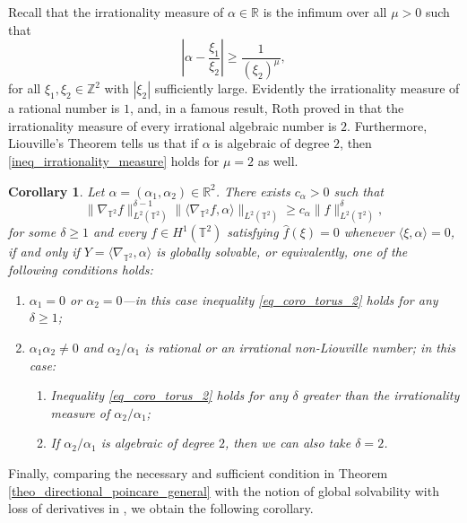 \documentclass[11pt]{amsart}
\numberwithin{theorem}{section}
\numberwithin{equation}{section}
\newtheorem{corollary}[theorem]{Corollary}
\theoremstyle{definition}
\numberwithin{example}{section}
\theoremstyle{definition}
\theoremstyle{definition}
\newcommand{\R}{\mathbb{R}}
\newcommand{\Z}{\mathbb{Z}}
\newcommand{\T}{\mathbb{T}}
\begin{document}
Recall that the irrationality measure of $\alpha\in\R$ is the infimum over all $\mu>0$ such that
\begin{equation}\label{ineq_irrationality_measure}
    \left|\alpha-\frac{\xi_1}{\xi_2}\right|\geq \frac{1}{(\xi_2)^{\mu}},
\end{equation}
for all $\xi_1,\xi_2\in\Z^2$ with $|\xi_2|$ sufficiently large. Evidently the irrationality measure of a rational number is $1$, and, in a famous result, Roth proved in \cite{Roth1955} that the irrationality measure of every irrational algebraic number is $2$. Furthermore, Liouville's Theorem tells us that if $\alpha$ is algebraic of degree $2$, then  \eqref{ineq_irrationality_measure} holds for $\mu=2$ as well.

\begin{corollary}\label{coro_t2}
      Let $\alpha=(\alpha_1,\alpha_2)\in\R^2$. There exists $c_\alpha>0$ such that     \begin{equation*}\label{eq_coro_torus_2}
        \|\nabla_{\T^2} f\|_{L^2(\T^2)}^{\delta-1}\| \langle \nabla_{\T^2} f,\alpha\rangle \|_{L^2(\T^2)}\geq c_\alpha\|f\|_{L^2(\T^2)}^\delta,
    \end{equation*}
     for some $\delta\geq 1$ and every $f\in H^1(\T^2)$ satisfying $\widehat{f}(\xi)=0$ whenever $\langle \xi,\alpha\rangle=0$, if and only if $Y=\langle \nabla_{\T^2},\alpha\rangle$ is globally solvable, or equivalently, 
    one of the following conditions holds:
    \begin{enumerate}
        \item[\it (1)] $\alpha_1=0$ or $\alpha_2=0$---in this case inequality \eqref{eq_coro_torus_2} holds for any $\delta\geq1$;
        \item[\it (2)] $\alpha_1\alpha_2\neq0$ and $\alpha_2/\alpha_1$  is rational or an irrational non-Liouville number; in this case:
        \begin{enumerate}
            \item[{\it (2.1)}] Inequality \eqref{eq_coro_torus_2} holds for any $\delta$ greater than the irrationality measure of $\alpha_2/\alpha_1$;
            \item[{\it (2.2)}] If $\alpha_2/\alpha_1$ is algebraic of degree $2$, then we can also take $\delta=2$.
        \end{enumerate}
    \end{enumerate}
\end{corollary}




Finally, comparing the necessary and sufficient condition in Theorem \ref{theo_directional_poincare_general} with the notion of global solvability with loss of derivatives in \cite{kk_loss}, we obtain the following corollary.
\end{document}
